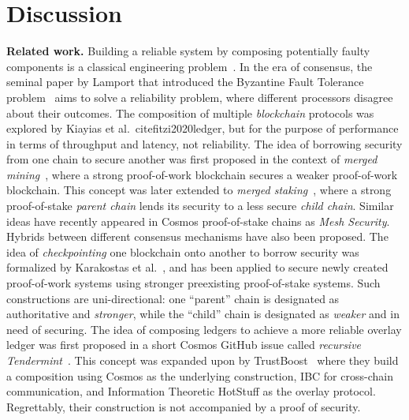 \section{Discussion}

\noindent
\textbf{Related work.}
Building a reliable system by composing potentially faulty components
is a classical engineering problem~\cite{von1956probabilistic,moore1956reliable}.
In the era of consensus, the seminal
paper by Lamport that introduced the Byzantine Fault Tolerance problem~\cite{shostak1982byzantine}
aims to solve a reliability problem, where different processors disagree about their
outcomes. The composition of multiple \emph{blockchain} protocols was explored by
Kiayias et al.~cite{fitzi2020ledger}, but for the purpose of performance in terms of throughput
and latency, not reliability. The idea of borrowing security from one chain to
secure another was first proposed in the context of \emph{merged mining}~\cite{namecoin}, where
a strong proof-of-work blockchain secures a weaker proof-of-work blockchain. This
concept was later extended to \emph{merged staking}~\cite{pos-sidechains}, where a
strong proof-of-stake \emph{parent chain} lends its security to a less secure
\emph{child chain}. Similar ideas have recently appeared in Cosmos proof-of-stake
chains as \emph{Mesh Security}. Hybrids between different consensus mechanisms
have also been proposed. The idea of \emph{checkpointing}
one blockchain onto another to borrow security was formalized by Karakostas et al.~\cite{karakostas2021securing},
and has been applied to secure newly created proof-of-work systems using stronger
preexisting proof-of-stake systems. Such constructions are uni-directional:
one ``parent'' chain is designated as authoritative and \emph{stronger},
while the ``child'' chain is designated as \emph{weaker} and in need of securing.
The idea of composing ledgers to achieve a more reliable overlay ledger
was first proposed in a short Cosmos GitHub issue called
\emph{recursive Tendermint}~\cite{recursive-tendermint}.
This concept was expanded upon by TrustBoost~\cite{trustboost}
where they build a composition using Cosmos as the underlying
construction, IBC for cross-chain communication, and Information Theoretic
HotStuff as the overlay protocol. Regrettably, their construction is not
accompanied by a proof of security.

